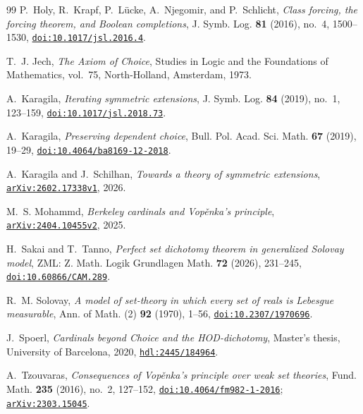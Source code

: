 \documentclass[11pt,a4paper]{amsart}
\theoremstyle{plain}
\theoremstyle{definition}
\theoremstyle{remark}
\begin{document}
\begin{thebibliography}{99}
P.~Holy, R.~Krapf, P.~L\"ucke, A.~Njegomir, and P.~Schlicht,
\emph{Class forcing, the forcing theorem, and Boolean completions},
J. Symb. Log. \textbf{81} (2016), no.~4, 1500--1530,
\href{https://doi.org/10.1017/jsl.2016.4}{\nolinkurl{doi:10.1017/jsl.2016.4}}.

T.~J. Jech,
\emph{The Axiom of Choice},
Studies in Logic and the Foundations of Mathematics, vol.~75,
North-Holland, Amsterdam, 1973.

A.~Karagila,
\emph{Iterating symmetric extensions},
J. Symb. Log. \textbf{84} (2019), no.~1, 123--159,
\href{https://doi.org/10.1017/jsl.2018.73}{\nolinkurl{doi:10.1017/jsl.2018.73}}.

A.~Karagila,
\emph{Preserving dependent choice},
Bull. Pol. Acad. Sci. Math. \textbf{67} (2019), 19--29,
\href{https://doi.org/10.4064/ba8169-12-2018}{\nolinkurl{doi:10.4064/ba8169-12-2018}}.

A.~Karagila and J.~Schilhan,
\emph{Towards a theory of symmetric extensions},
\href{https://arxiv.org/abs/2602.17338}{\nolinkurl{arXiv:2602.17338v1}}, 2026.

M.~S. Mohammd,
\emph{Berkeley cardinals and Vop\v{e}nka's principle},
\href{https://arxiv.org/abs/2404.10455v2}{\nolinkurl{arXiv:2404.10455v2}}, 2025.

H.~Sakai and T.~Tanno,
\emph{Perfect set dichotomy theorem in generalized Solovay model},
ZML: Z. Math. Logik Grundlagen Math. \textbf{72} (2026), 231--245,
\href{https://doi.org/10.60866/CAM.289}{\nolinkurl{doi:10.60866/CAM.289}}.

R.~M. Solovay,
\emph{A model of set-theory in which every set of reals is Lebesgue measurable},
Ann. of Math. (2) \textbf{92} (1970), 1--56,
\href{https://doi.org/10.2307/1970696}{\nolinkurl{doi:10.2307/1970696}}.

J.~Spoerl,
\emph{Cardinals beyond Choice and the HOD-dichotomy},
Master's thesis, University of Barcelona, 2020,
\href{https://hdl.handle.net/2445/184964}{\nolinkurl{hdl:2445/184964}}.

A.~Tzouvaras,
\emph{Consequences of Vop\v{e}nka's principle over weak set theories},
Fund. Math. \textbf{235} (2016), no.~2, 127--152,
\href{https://doi.org/10.4064/fm982-1-2016}{\nolinkurl{doi:10.4064/fm982-1-2016}};
\href{https://arxiv.org/abs/2303.15045}{\nolinkurl{arXiv:2303.15045}}.


\end{thebibliography}
\end{document}
